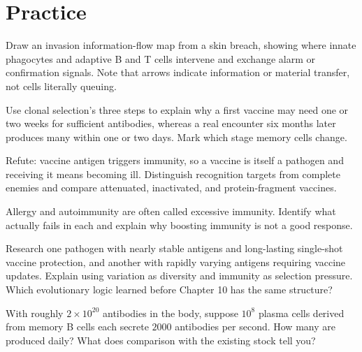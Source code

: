 \section*{Practice}

\begin{sikaoti}
\item Draw an invasion information-flow map from a skin breach, showing where innate phagocytes and adaptive B and T cells intervene and exchange alarm or confirmation signals. Note that arrows indicate information or material transfer, not cells literally queuing.
\item Use clonal selection's three steps to explain why a first vaccine may need one or two weeks for sufficient antibodies, whereas a real encounter six months later produces many within one or two days. Mark which stage memory cells change.
\item Refute: vaccine antigen triggers immunity, so a vaccine is itself a pathogen and receiving it means becoming ill. Distinguish recognition targets from complete enemies and compare attenuated, inactivated, and protein-fragment vaccines.
\item Allergy and autoimmunity are often called excessive immunity. Identify what actually fails in each and explain why boosting immunity is not a good response.
\item Research one pathogen with nearly stable antigens and long-lasting single-shot vaccine protection, and another with rapidly varying antigens requiring vaccine updates. Explain using variation as diversity and immunity as selection pressure. Which evolutionary logic learned before Chapter 10 has the same structure?
\item With roughly $2\times 10^{20}$ antibodies in the body, suppose $10^{8}$ plasma cells derived from memory B cells each secrete $2000$ antibodies per second. How many are produced daily? What does comparison with the existing stock tell you?
\end{sikaoti}
